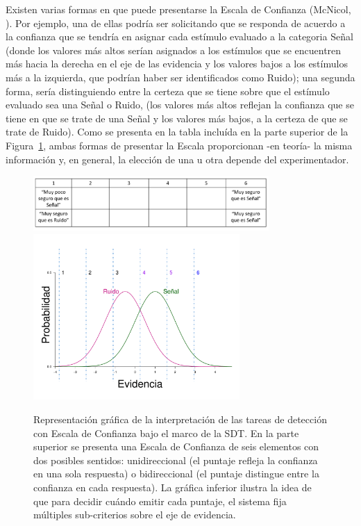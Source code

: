\begin{itemize}
Existen varias formas en que puede presentarse la Escala de Confianza (McNicol, \citeyear{McNicol2}). Por ejemplo, una de ellas podría ser solicitando que se responda de acuerdo a la confianza que se tendría en asignar cada estímulo evaluado a la categoria Señal (donde los valores más altos serían asignados a los estímulos que se encuentren más hacia la derecha en el eje de las evidencia y los valores bajos a los estímulos más a la izquierda, que podrían haber ser identificados como Ruido); una segunda forma, sería distinguiendo entre la certeza que se tiene sobre que el estímulo evaluado sea una Señal o Ruido, (los valores más altos reflejan la confianza que se tiene en que se trate de una Señal y los valores más bajos, a la certeza de que se trate de Ruido). Como se presenta en la tabla incluída en la parte superior de la Figura~\ref{fig:Conf_Rat}, ambas formas de presentar la Escala proporcionan -en teoría- la misma información y, en general, la elección de una u otra depende del experimentador.\\

\begin{figure}[th]
\centering
\includegraphics[width=0.80\textwidth]{Figures/Puntajes_Criterios}\\
\includegraphics[width=0.70\textwidth]{Figures/ConfidenceRating}\\
\caption[Tareas de detección con Escala de Confianza y su interpretación]{Representación gráfica de la interpretación de las tareas de detección con Escala de Confianza bajo el marco de la SDT. En la parte superior se presenta una Escala de Confianza de seis elementos con dos posibles sentidos: unidireccional (el puntaje refleja la confianza en una sola respuesta) o bidireccional (el puntaje distingue entre la confianza en cada respuesta). La gráfica inferior ilustra la idea de que para decidir cuándo emitir cada puntaje, el sistema fija múltiples sub-criterios sobre el eje de evidencia.}
\label{fig:Conf_Rat}
\end{figure}


\end{itemize}
